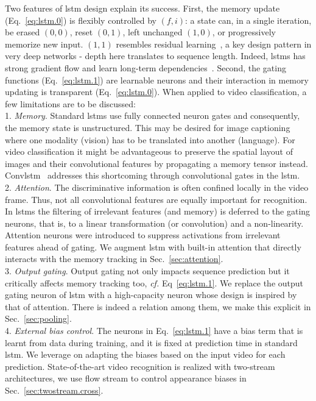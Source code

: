 \documentclass[10pt,twocolumn,letterpaper]{article}
\begin{document}
Two features of \ac{lstm} design explain its success. First, the memory update (Eq.~\ref{eq:lstm.0}) is flexibly controlled by $(f,i)$: a state can, in a single iteration, be erased $(0,0)$, reset $(0,1)$, left unchanged $(1,0)$, or progressively memorize new input. $(1,1)$ resembles residual learning~\cite{he16residual}, a key design pattern in very deep networks - depth here translates to sequence length. Indeed, \acp{lstm} has strong gradient flow and learn long-term dependencies~\cite{Hochreiter:1997:LSM:1246443.1246450}. Second, the gating functions (Eq.~\ref{eq:lstm.1}) are learnable neurons and their interaction in memory updating is transparent (Eq.~\ref{eq:lstm.0}). When applied to video classification, a few limitations are to be discussed:\\
{1. \em Memory}. Standard \acp{lstm} use fully connected neuron gates and consequently, the memory state is unstructured. This may be desired \eg for image captioning where one modality (vision) has to be translated into another (language). For video classification it might be advantageous to preserve the spatial layout of images and their convolutional features by propagating a memory tensor instead. Conv\ac{lstm}~\cite{shi15convlstm} addresses this shortcoming through convolutional gates in the \ac{lstm}.\\
{2. \em Attention}. The discriminative information is often confined locally in the video frame. Thus, not all convolutional features are equally important for recognition. In \acp{lstm} the filtering of irrelevant features (and memory) is deferred to the gating neurons, that is, to a linear transformation (or convolution) and a non-linearity. Attention neurons were introduced to suppress activations from irrelevant features ahead of gating. We augment \ac{lstm} with built-in attention that directly interacts with the memory tracking in Sec.~\ref{sec:attention}.\\
{3. \em Output gating}. Output gating not only impacts sequence prediction but it critically affects memory tracking too, \emph{cf.} Eq~\ref{eq:lstm.1}. We replace the output gating neuron of \ac{lstm} with a high-capacity neuron whose design is inspired by that of attention. There is indeed a relation among them, we make this explicit in Sec.~\ref{sec:pooling}.\\
{4. \em External bias control}. The neurons in Eq.~\ref{eq:lstm.1} have a bias term that is learnt from data during training, and it is fixed at prediction time in standard \ac{lstm}. We leverage on adapting the biases based on the input video for each prediction. State-of-the-art video recognition is realized with two-stream architectures, we use flow stream to control appearance biases in Sec.~\ref{sec:twostream.cross}.
 
\end{document}
